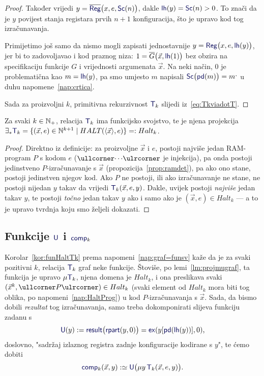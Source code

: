 \begin{proof}
Također vrijedi $y=\overline{\f{Reg}}\bigl(x,e,\f{Sc}(n)\bigr)$, dakle $\f{lh}(y)=\f{Sc}(n)>0$. To znači da je $y$ povijest stanja registara prvih $n+1$ konfiguracija, što je upravo kod tog izračunavanja.

Primijetimo još samo da nismo mogli zapisati jednostavnije $y=\f{Reg}\bigl(x,e,\f{lh}(y)\bigr)$, jer bi to zadovoljavao i kod praznog niza: $1=\overline G\bigl(\vec x,\f{lh}(1)\bigr)$ bez obzira na specifikaciju funkcije $G$ i vrijednosti argumenata $\vec x$. Na neki način, $0$ je problematična kao $m=\f{lh}(y)$, pa smo umjesto $m$ napisali $\f{Sc}\bigl(\f{pd}(m)\bigr)=m\bump$ u duhu napomene~\ref{nap:crtica}.

Sada za proizvoljni $k$, primitivna rekurzivnost $\f T_k$ slijedi iz~\eqref{eq:TkviadotT}.
\end{proof}

\begin{korolar}\label{kor:funHaltTk}
    Za svaki $k\in{\mathbb N}_+$, relacija $\f T_k$ ima funkcijsko svojstvo, te je njena projekcija $\exists_*\f T_k=\{(\vec x,e)\in\N^{k+1}\mid HALT(\langle\vec x\rangle,e)\}=:Halt_k$.
\end{korolar}
\begin{proof}
Direktno iz definicije: za proizvoljne $\vec x$ i $e$, postoji najviše jedan RAM-program $P$ s kodom $e$ ($\kprog{\cdots}$ je injekcija), pa onda postoji jedinstveno $P$-izračunavanje s $\vec x$ (propozicija~\ref{prop:ramdet}), pa ako ono stane, postoji jedinstven njegov kod. Ako $P$ ne postoji, ili ako izračunavanje ne stane, ne postoji nijedan $y$ takav da vrijedi $\f T_k(\vec x,e,y)$. Dakle, uvijek postoji \emph{najviše} jedan takav $y$, te postoji \emph{točno} jedan takav $y$ ako i samo ako je $(\vec x,e)\in Halt_k$ --- a to je upravo tvrdnja koju smo željeli dokazati.
\end{proof}

\subsection{Funkcije \texorpdfstring{$\f U$ i $\f{comp}_k$}{U i comp}}

Korolar~\ref{kor:funHaltTk} prema napomeni~\ref{nap:graf=funsv} kaže da je za svaki pozitivni $k$, relacija $\f T_k$ graf neke funkcije. Štoviše, po lemi~\ref{lm:projmugraf}, ta funkcija je upravo $\mu\f T_k$, njena domena je $Halt_k$, i ona preslikava svaki $(\vec x^k,\kprog{P})\in Halt_k$ (svaki element od $Halt_k$ mora biti tog oblika, po napomeni~\ref{nap:HaltProg}) u kod $P$-izračunavanja s $\vec x$. Sada, da bismo dobili \emph{rezultat} tog izračunavanja, samo treba dokomponirati slijeva funkciju zadanu s
\begin{equation}\label{eq:Udef}
    \f U(y):=\f{result}\bigl(\f{rpart}(y,0)\bigr)=\f{ex}(y[\f{pd}(\f{lh}(y))],0)\text,
\end{equation}
doslovno, "sadržaj izlaznog registra zadnje konfiguracije kodirane s $y$", te ćemo dobiti
\begin{equation}
    \f{comp}_k(\vec x,y):\simeq \f U\bigl(\mu y\,\f T_k(\vec x,e,y)\bigr)\text.
\end{equation}

